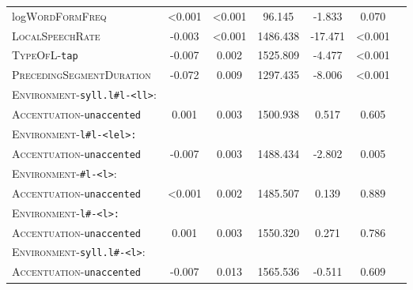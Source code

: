 \begin{table}[H]
{\begin{tabular}{lSSSSSS}
		log\textsc{WordFormFreq }& \color{lsGuidelinesGray} <0.001 & \color{lsGuidelinesGray} <0.001 & \color{lsGuidelinesGray} 96.145 & \color{lsGuidelinesGray} -1.833 & \color{lsGuidelinesGray} 0.070 \\ 
		
		\textsc{LocalSpeechRate} & -0.003 &<0.001  & 1486.438 & -17.471 &<0.001 \\ 
		
		
		\textsc{TypeOfL}-\texttt{tap} & -0.007 & 0.002 & 1525.809 & -4.477 & <0.001 \\ 
		
		\textsc{PrecedingSegmentDuration} & -0.072 & 0.009 & 1297.435 & -8.006 & <0.001 \\ 
		
		\textsc{Environment}-\texttt{syll.l\#l-<ll>}:&&&&&\\
		\textsc{Accentuation}-\texttt{unaccented} & \color{lsGuidelinesGray} 0.001 & \color{lsGuidelinesGray} 0.003 & \color{lsGuidelinesGray} 1500.938 &\color{lsGuidelinesGray}  0.517 & \color{lsGuidelinesGray} 0.605 \\ 
		
		\textsc{Environment}-\texttt{l\#l-<lel>:}&&&&&\\
		\textsc{Accentuation}-\texttt{unaccented} & -0.007 & 0.003 & 1488.434 & -2.802 & 0.005 \\
		
		\textsc{Environment}-\texttt{\#l-<l>}:&&&&&\\
		\textsc{Accentuation}-\texttt{unaccented} & \color{lsGuidelinesGray} <0.001  & \color{lsGuidelinesGray} 0.002 & \color{lsGuidelinesGray} 1485.507 & \color{lsGuidelinesGray} 0.139 & \color{lsGuidelinesGray} 0.889 \\ 
		
		\textsc{Environment}-\texttt{l\#-<l>:}&&&&&\\
		\textsc{Accentuation}-\texttt{unaccented} & \color{lsGuidelinesGray} 0.001 & \color{lsGuidelinesGray} 0.003 & \color{lsGuidelinesGray} 1550.320 &  \color{lsGuidelinesGray} 0.271 &\color{lsGuidelinesGray}  0.786 \\ 
		
		\textsc{Environment}-\texttt{syll.l\#-<l>}:&&&&&\\
		\textsc{Accentuation}-\texttt{unaccented} &\color{lsGuidelinesGray}  -0.007 &\color{lsGuidelinesGray}  0.013 & \color{lsGuidelinesGray} 1565.536 &\color{lsGuidelinesGray}  -0.511 &\color{lsGuidelinesGray}  0.609 \\ 
		

\end{tabular}}
\end{table}
